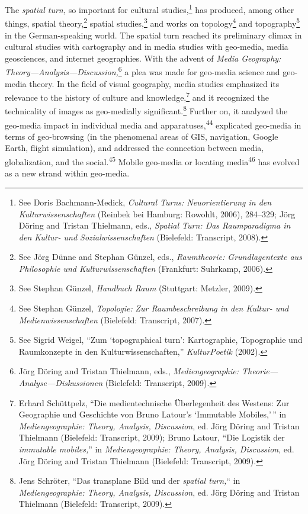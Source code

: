 \documentclass{tufte-handout}
\begin{document}
The \emph{spatial turn,} so important for cultural studies,\footnote{See
  Doris Bachmann-Medick, \emph{Cultural Turns: Neuorientierung in den
  Kulturwissenschaften} (Reinbek bei Hamburg: Rowohlt, 2006), 284--329;
  Jörg Döring and Tristan Thielmann, eds., \emph{Spatial Turn: Das
  Raumparadigma in den Kultur- und Sozialwissenschaften} (Bielefeld:
  Transcript, 2008).} has produced, among other things, spatial
theory,\footnote{See Jörg Dünne and Stephan Günzel, eds.,
  \emph{Raumtheorie: Grundlagentexte aus Philosophie und
  Kulturwissenschaften} (Frankfurt: Suhrkamp, 2006).} spatial
studies,\footnote{See Stephan Günzel, \emph{Handbuch Raum} (Stuttgart:
  Metzler, 2009).} and works on topology\footnote{See Stephan Günzel,
  \emph{Topologie:} \emph{Zur Raumbeschreibung in den Kultur- und
  Medienwissenschaften} (Bielefeld: Transcript, 2007).} and
topography\footnote{See Sigrid Weigel, ``Zum `topographical turn':
  Kartographie, Topographie und Raumkonzepte in den
  Kulturwissenschaften,'' \emph{KulturPoetik} (2002).} in the
German-speaking world. The spatial turn reached its preliminary climax
in cultural studies with cartography and in media studies with
geo-media, media geosciences, and internet geographies. With the advent
of \emph{Media Geography: Theory---Analysis---Discussion,}\footnote{Jörg
  Döring and Tristan Thielmann, eds., \emph{Mediengeographie:
  Theorie---Analyse---Diskussionen} (Bielefeld: Transcript, 2009).} a
plea was made for geo-media science and geo-media theory. In the field
of visual geography, media studies emphasized its relevance to the
history of culture and knowledge,\footnote{Erhard Schüttpelz, ``Die
  medientechnische Überlegenheit des Westens: Zur Geographie und
  Geschichte von Bruno Latour's `Immutable Mobiles,'\,'' in
  \emph{Mediengeographie: Theory, Analysis, Discussion}, ed. Jörg Döring
  and Tristan Thielmann (Bielefeld: Transcript, 2009); Bruno Latour,
  ``Die Logistik der \emph{immutable mobiles,}'' in
  \emph{Mediengeographie: Theory, Analysis, Discussion}, ed. Jörg Döring
  and Tristan Thielmann (Bielefeld: Transcript, 2009).} and it
recognized the technicality of images as geo-medially
significant.\footnote{Jens Schröter, ``Das transplane Bild und der
  \emph{spatial turn,}`` in \emph{Mediengeographie: Theory, Analysis,
  Discussion}, ed. Jörg Döring and Tristan Thielmann (Bielefeld:
  Transcript, 2009).} Further on, it analyzed the geo-media impact in
individual media and apparatuses,\textsuperscript{44} explicated geo-media in terms of geo-browsing (in
the phenomenal areas of GIS, navigation, Google Earth, flight
simulation), and addressed the connection between media, globalization,
and the social.\textsuperscript{45} Mobile geo-media or locating media\textsuperscript{46} has
evolved as a new strand within geo-media.
\end{document}
